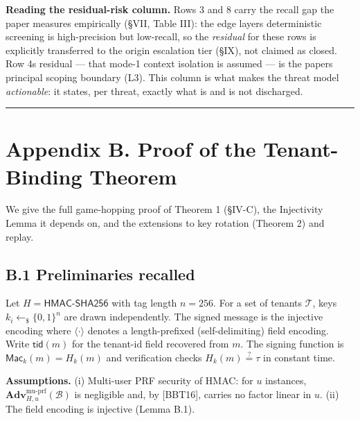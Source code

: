 \textbf{Reading the residual-risk column.} Rows 3 and 8 carry the recall
gap the paper measures empirically (§VII, Table III): the edge
layer\textquotesingle s deterministic screening is high-precision but
low-recall, so the \emph{residual} for these rows is explicitly
transferred to the origin escalation tier (§IX), not claimed as closed.
Row 4\textquotesingle s residual --- that mode-1 context isolation is
assumed --- is the paper\textquotesingle s principal scoping boundary
(L3). This column is what makes the threat model \emph{actionable}: it
states, per threat, exactly what is and is not discharged.

\begin{center}\rule{0.5\linewidth}{0.5pt}\end{center}

\section{Appendix B. Proof of the Tenant-Binding
Theorem}\label{appendix-b-proof-of-the-tenant-binding-theorem}

We give the full game-hopping proof of Theorem 1 (§IV-C), the
Injectivity Lemma it depends on, and the extensions to key rotation
(Theorem 2) and replay.

\subsection{B.1 Preliminaries recalled}\label{b1-preliminaries-recalled}

Let \(H=\mathsf{HMAC\text{-}SHA256}\) with tag length \(n=256\). For a
set of tenants \(\mathcal{T}\), keys \(k_i \leftarrow_\$ \{0,1\}^n\) are
drawn independently. The signed message is the injective encoding
where \(\langle\cdot\rangle\) denotes a length-prefixed
(self-delimiting) field encoding. Write \(\mathsf{tid}(m)\) for the
tenant-id field recovered from \(m\). The signing function is
\(\mathsf{Mac}_{k}(m)=H_k(m)\) and verification checks
\(H_k(m)\stackrel{?}{=}\tau\) in constant time.

\textbf{Assumptions.} (i) Multi-user PRF security of HMAC: for \(u\)
instances, \(\mathbf{Adv}^{\text{mu-prf}}_{H,u}(\mathcal{B})\) is
negligible and, by {[}BBT16{]}, carries no factor linear in \(u\). (ii)
The field encoding is injective (Lemma B.1).

